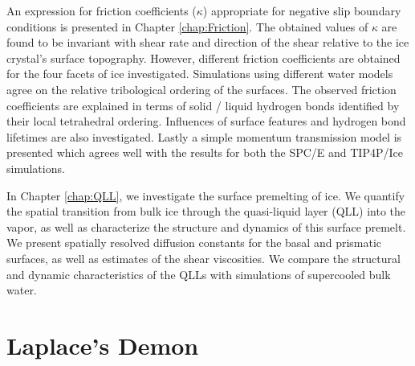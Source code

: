 An expression for friction coefficients ($\kappa$) appropriate for
negative slip boundary conditions is presented in Chapter
\ref{chap:Friction}. The obtained values of $\kappa$ are found to be
invariant with shear rate and direction of the shear relative to the ice
crystal's surface topography. However, different friction
coefficients are obtained for the four facets of ice investigated.
Simulations using different water models agree on the relative
tribological ordering of the surfaces. The observed friction
coefficients are explained in terms of solid / liquid hydrogen bonds
identified by their local tetrahedral ordering. Influences of surface
features and hydrogen bond lifetimes are also investigated. Lastly a
simple momentum transmission model is presented which agrees well with
the results for both the SPC/E and TIP4P/Ice simulations.

In Chapter \ref{chap:QLL}, we investigate the surface premelting of
ice. We quantify the spatial transition from bulk ice through the
quasi-liquid layer (QLL) into the vapor, as well as characterize the
structure and dynamics of this surface premelt. We present spatially
resolved diffusion constants for the basal and prismatic surfaces, as
well as estimates of the shear viscosities. We compare the structural
and dynamic characteristics of the QLLs with simulations of
supercooled bulk water. 

\section{Laplace's Demon}





